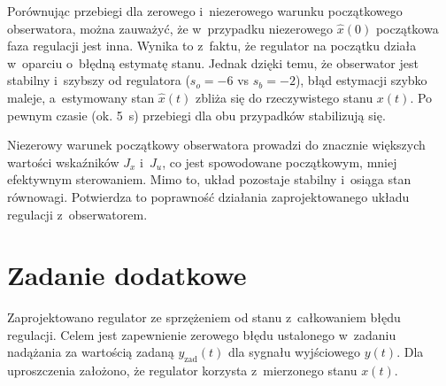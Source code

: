 \documentclass[a4paper,titlepage,11pt,floatssmall]{mwrep} %
\begin{document}
Porównując przebiegi dla zerowego i~niezerowego warunku początkowego obserwatora, można zauważyć, że w~przypadku niezerowego $\hat{x}(0)$ początkowa faza regulacji jest inna. Wynika to z~faktu, że regulator na początku działa w~oparciu o~błędną estymatę stanu. Jednak dzięki temu, że obserwator jest stabilny i~szybszy od regulatora ($s_o = -6$ vs $s_b = -2$), błąd estymacji szybko maleje, a~estymowany stan $\hat{x}(t)$ zbliża się do rzeczywistego stanu $x(t)$. Po pewnym czasie (ok. \SI{5}{\second}) przebiegi dla obu przypadków stabilizują się.

Niezerowy warunek początkowy obserwatora prowadzi do znacznie większych wartości wskaźników $J_x$ i~$J_u$, co jest spowodowane początkowym, mniej efektywnym sterowaniem. Mimo to, układ pozostaje stabilny i~osiąga stan równowagi. Potwierdza to poprawność działania zaprojektowanego układu regulacji z~obserwatorem.

\FloatBarrier
\chapter{Zadanie dodatkowe}

Zaprojektowano regulator ze sprzężeniem od stanu z~całkowaniem błędu regulacji. Celem jest zapewnienie zerowego błędu ustalonego w~zadaniu nadążania za wartością zadaną $y_{\text{zad}}(t)$ dla sygnału wyjściowego $y(t)$. Dla uproszczenia założono, że regulator korzysta z~mierzonego stanu $x(t)$.
\end{document}
